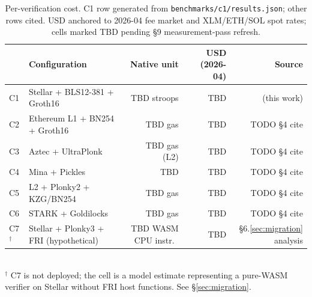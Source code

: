 \begin{table}[t]
  \centering
  \caption{Per-verification cost. C1 row generated from
    \texttt{benchmarks/c1/results.json}; other rows cited. USD
    anchored to 2026-04 fee market and
    XLM/ETH/SOL spot rates; cells marked TBD pending §9
    measurement-pass refresh.}
  \label{tab:cost}
  \begin{tabular}{llrrr}
    \toprule
    & Configuration & Native unit & USD (2026-04) & Source \\
    \midrule
    C1  & Stellar + BLS12-381 + Groth16            & TBD stroops    & TBD & \cite{sep-onym} (this work) \\
    C2  & Ethereum L1 + BN254 + Groth16            & TBD gas        & TBD & TODO §4 cite \\
    C3  & Aztec + UltraPlonk                       & TBD gas (L2)   & TBD & TODO §4 cite \\
    C4  & Mina + Pickles                           & TBD            & TBD & TODO §4 cite \\
    C5  & L2 + Plonky2 + KZG/BN254                 & TBD gas        & TBD & TODO §4 cite \\
    C6  & STARK + Goldilocks                       & TBD gas        & TBD & TODO §4 cite \\
    C7$^\dagger$ & Stellar + Plonky3 + FRI (hypothetical) & TBD WASM CPU instr.\ & TBD & §6.\ref{sec:migration} analysis \\
    \bottomrule
  \end{tabular}
  \\[0.5em]
  \footnotesize
  $^\dagger$ C7 is not deployed; the cell is a model estimate
  representing a pure-WASM verifier on Stellar without FRI host
  functions. See \S\ref{sec:migration}.
\end{table}
